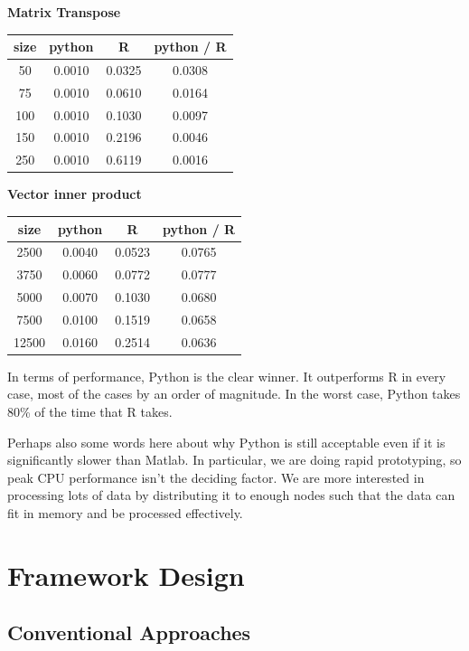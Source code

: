 \documentclass[%
        final,
        notitlepage,
        narroweqnarray,
        inline,
        ]{ieee}
\begin{document}
\begin{center}
\vspace{1em}
    \textbf{Matrix Transpose} \\
\begin{tabular}{cccc}
size  & python  &  R       & python / R \\
  \hline
50  & 0.0010  & 0.0325 & 0.0308 \\
75  & 0.0010  & 0.0610 & 0.0164 \\
100 & 0.0010  & 0.1030 & 0.0097 \\
150 & 0.0010  & 0.2196 & 0.0046 \\
250 & 0.0010  & 0.6119 & 0.0016 \\
\end{tabular}

\vspace{1em}
\textbf{Vector inner product} \\
\begin{tabular}{cccc}
size  & python  &  R       & python / R \\
  \hline
2500  & 0.0040 & 0.0523 & 0.0765 \\
3750  & 0.0060 & 0.0772 & 0.0777 \\
5000  & 0.0070 & 0.1030 & 0.0680 \\
7500  & 0.0100 & 0.1519 & 0.0658 \\
12500 & 0.0160 & 0.2514 & 0.0636 \\
\end{tabular}

\end{center}

In terms of performance, Python is the clear winner. It outperforms R in every case, most of the cases by an order of magnitude. In the worst case, Python takes 80\% of the time that R takes.

Perhaps also some words here about why Python is still acceptable even if it is
significantly slower than Matlab. In particular, we are doing rapid
prototyping, so peak CPU performance isn't the deciding factor. We are more
interested in processing lots of data by distributing it to enough nodes such
that the data can fit in memory and be processed effectively.

\section{Framework Design}

\subsection{Conventional Approaches}
\end{document}
